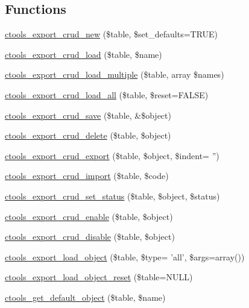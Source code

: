 \subsection*{Functions}
\begin{DoxyCompactItemize}
\item 
\hyperlink{group__export__crud_gafa3d98363b3c0cd3aa90d2d4e9215fbc}{ctools\_\-export\_\-crud\_\-new} (\$table, \$set\_\-defaults=TRUE)
\item 
\hyperlink{group__export__crud_gafdb2a891145f268c573653fe61c79fa3}{ctools\_\-export\_\-crud\_\-load} (\$table, \$name)
\item 
\hyperlink{group__export__crud_ga9394c795ebcc27aa0078668ba1b80102}{ctools\_\-export\_\-crud\_\-load\_\-multiple} (\$table, array \$names)
\item 
\hyperlink{group__export__crud_gac25f1e05b48984949bfa0d82e2f6908b}{ctools\_\-export\_\-crud\_\-load\_\-all} (\$table, \$reset=FALSE)
\item 
\hyperlink{group__export__crud_ga026370fc39c98bb82c70f223642044cf}{ctools\_\-export\_\-crud\_\-save} (\$table, \&\$object)
\item 
\hyperlink{group__export__crud_gac99a2a09acebd603aeff488b24ed1362}{ctools\_\-export\_\-crud\_\-delete} (\$table, \$object)
\item 
\hyperlink{group__export__crud_ga7c6ace5b3a936babe3394b02c5fa2f50}{ctools\_\-export\_\-crud\_\-export} (\$table, \$object, \$indent= '')
\item 
\hyperlink{group__export__crud_gacef0d6e3eee416774e6e08c497ed62bb}{ctools\_\-export\_\-crud\_\-import} (\$table, \$code)
\item 
\hyperlink{group__export__crud_gabece68057272d59c9fcb6529bbd81211}{ctools\_\-export\_\-crud\_\-set\_\-status} (\$table, \$object, \$status)
\item 
\hyperlink{group__export__crud_gaf83f6d3c4b7d96b62ef7201de24ce0b7}{ctools\_\-export\_\-crud\_\-enable} (\$table, \$object)
\item 
\hyperlink{group__export__crud_ga1f0a12ff967fe1204072ff22267da14e}{ctools\_\-export\_\-crud\_\-disable} (\$table, \$object)
\item 
\hyperlink{export_8inc_aace7bae1172d5e4ac756fa942de06d6e}{ctools\_\-export\_\-load\_\-object} (\$table, \$type= 'all', \$args=array())
\item 
\hyperlink{export_8inc_ae9e981ecdb3ab89a053de44785ae0c31}{ctools\_\-export\_\-load\_\-object\_\-reset} (\$table=NULL)
\item 
\hyperlink{export_8inc_a35947bcb7777884b7c5c4b3fe1c3a14a}{ctools\_\-get\_\-default\_\-object} (\$table, \$name)

\end{DoxyCompactItemize}
